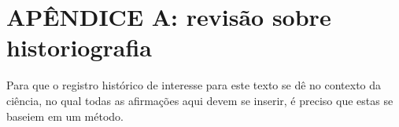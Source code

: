 \documentclass[
12pt,		%
openright,	%
twoside,  %
a4paper,			%
chapter=TITLE,		%
english,			%
french,				%
spanish,			%
brazil				%
]{USPSC-classe/USPSC}
\begin{document}
\begin{flushleft}
\begin{flushleft}
\begin{flushleft}
\begin{flushleft}
\begin{flushleft}
\begin{flushleft}
\begin{flushleft}
\begin{flushleft}

\end{flushleft}


\end{flushleft}


\end{flushleft}


\end{flushleft}


\end{flushleft}


\end{flushleft}


\end{flushleft}


\end{flushleft}


\begin{flushleft}
\begin{flushleft}
\begin{flushleft}
\begin{flushleft}
\begin{flushleft}
\begin{flushleft}
\begin{flushleft}
\begin{flushleft}

\end{flushleft}


\end{flushleft}


\end{flushleft}


\end{flushleft}


\end{flushleft}


\end{flushleft}


\end{flushleft}


\end{flushleft}


\chapter[AP\^ENDICE A: revis\~ao sobre historiografia]{AP\^ENDICE A: revis\~ao sobre historiografia}\label{AP\^ENDICE A: revis\~ao sobre historiografia}
Para que o registro hist\'orico de interesse para este texto se d\^e no contexto da ci\^encia, no qual todas as afirma\c{c}\~oes aqui devem se inserir, \'e preciso que estas se baseiem em um m\'etodo.
\end{document}
